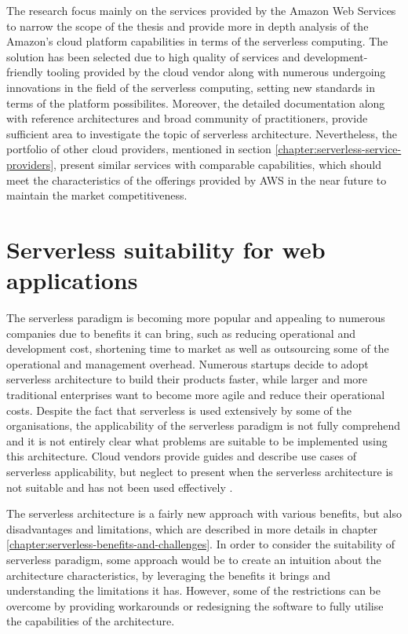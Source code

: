 The research focus mainly on the services provided by the Amazon Web Services to narrow the scope of the thesis and provide more in depth analysis of the Amazon's cloud platform capabilities in terms of the serverless computing.
The solution has been selected due to high quality of services and development-friendly tooling provided by the cloud vendor along with numerous undergoing innovations in the field of the serverless computing, setting new standards in terms of the platform possibilites.
Moreover, the detailed documentation along with reference architectures and broad community of practitioners, provide sufficient area to investigate the topic of serverless architecture.
Nevertheless, the portfolio of other cloud providers, mentioned in section \ref{chapter:serverless-service-providers}, present similar services with comparable capabilities, which should meet the characteristics of the offerings provided by AWS in the near future to maintain the market competitiveness.

\section{Serverless suitability for web applications} \label{chapter:serverless-suitability}

The serverless paradigm is becoming more popular and appealing to numerous companies due to benefits it can bring, such as reducing operational and development cost, shortening time to market as well as outsourcing some of the operational and management overhead.
Numerous startups decide to adopt serverless architecture to build their products faster, while larger and more traditional enterprises want to become more agile and reduce their operational costs.
Despite the fact that serverless is used extensively by some of the organisations, the applicability of the serverless paradigm is not fully comprehend and it is not entirely clear what problems are suitable to be implemented using this architecture.
Cloud vendors provide guides and describe use cases of serverless applicability, but neglect to present when the serverless architecture is not suitable and has not been used effectively \cite{EvaluationOfServerlessApplicationProgrammingModel}.

The serverless architecture is a fairly new approach with various benefits, but also disadvantages and limitations, which are described in more details in chapter \ref{chapter:serverless-benefits-and-challenges}.
In order to consider the suitability of serverless paradigm, some approach would be to create an intuition about the architecture characteristics, by leveraging the benefits it brings and understanding the limitations it has.
However, some of the restrictions can be overcome by providing workarounds or redesigning the software to fully utilise the capabilities of the architecture.


